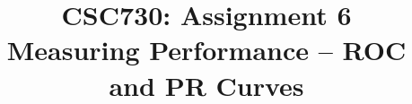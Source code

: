 \documentclass[conference]{IEEEtran}
\begin{document}
\title{CSC730: Assignment 6\\Measuring Performance – ROC and PR Curves

}



\maketitle

%






%

\printbibliography{}

\vspace{12pt}
\end{document}
